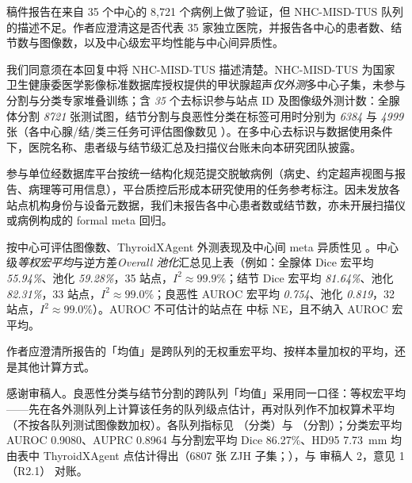 \begin{reviewercomment}
稿件报告在来自 35 个中心的 8,721 个病例上做了验证，但 NHC-MISD-TUS 队列的描述不足。作者应澄清这是否代表 35 家独立医院，并报告各中心的患者数、结节数与图像数，以及中心级宏平均性能与中心间异质性。
\end{reviewercomment}
\begin{authorresponse}
我们同意须在本回复中将 NHC-MISD-TUS 描述清楚。NHC-MISD-TUS 为国家卫生健康委医学影像标准数据库授权提供的甲状腺超声\emph{仅外测}多中心子集，未参与分割与分类专家堆叠训练；含 \emph{35} 个去标识参与站点 ID 及图像级外测计数：全腺体分割 \emph{8721} 张测试图，结节分割与良恶性分类在标签可用时分别为 \emph{6384} 与 \emph{4999} 张（各中心腺/结/类三任务可评估图像数见 ）。在多中心去标识与数据使用条件下，医院名称、患者级与结节级汇总及扫描仪台账未向本研究团队披露。\par
参与单位经数据库平台按统一结构化规范提交脱敏病例（病史、约定超声视图与报告、病理等可用信息），平台质控后形成本研究使用的任务参考标注。因未发放各站点机构身份与设备元数据，我们未报告各中心患者数或结节数，亦未开展扫描仪或病例构成的 formal meta 回归。\par
按中心可评估图像数、ThyroidXAgent 外测表现及中心间 meta 异质性见 。中心级\emph{等权宏平均}与逆方差\emph{Overall 池化}汇总见上表（例如：全腺体 Dice 宏平均 \emph{55.94\%}、池化 \emph{59.28\%}，35 站点，$I^2{\approx}99.9\%$；结节 Dice 宏平均 \emph{81.64\%}、池化 \emph{82.31\%}，33 站点，$I^2{\approx}99.0\%$；良恶性 AUROC 宏平均 \emph{0.754}、池化 \emph{0.819}，32 站点，$I^2{\approx}99.0\%$）。AUROC 不可估计的站点在  中标 NE，且不纳入 AUROC 宏平均。\par
\par
\end{authorresponse}

\begin{reviewercomment}
作者应澄清所报告的「均值」是跨队列的无权重宏平均、按样本量加权的平均，还是其他计算方式。
\end{reviewercomment}
\begin{authorresponse}
感谢审稿人。良恶性分类与结节分割的跨队列「均值」采用同一口径：等权宏平均——先在各外测队列上计算该任务的队列级点估计，再对队列作不加权算术平均（不按各队列测试图像数加权）。各队列指标见 （分类）与 （分割）；分类宏平均 AUROC 0.9080、AUPRC 0.8964 与分割宏平均 Dice 86.27\%、HD95 7.73~mm 均由表中 ThyroidXAgent 点估计得出（6807 张 ZJH 子集；），与 审稿人 2，意见 1（R2.1） 对账。
\par
\end{authorresponse}

